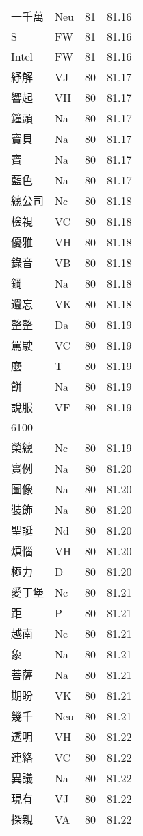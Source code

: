 \documentclass[twocolumn]{book}
\begin{document}
\begin{supertabular}{llrr}
一千萬 & Neu & 81 &  81.16\\
S & FW & 81 &  81.16\\
Intel & FW & 81 &  81.16\\
紓解 & VJ & 80 &  81.17\\
響起 & VH & 80 &  81.17\\
鐘頭 & Na & 80 &  81.17\\
寶貝 & Na & 80 &  81.17\\
寶 & Na & 80 &  81.17\\
藍色 & Na & 80 &  81.17\\
總公司 & Nc & 80 &  81.18\\
檢視 & VC & 80 &  81.18\\
優雅 & VH & 80 &  81.18\\
錄音 & VB & 80 &  81.18\\
鋼 & Na & 80 &  81.18\\
遺忘 & VK & 80 &  81.18\\
整整 & Da & 80 &  81.19\\
駕駛 & VC & 80 &  81.19\\
麼 & T & 80 &  81.19\\
餅 & Na & 80 &  81.19\\
說服 & VF & 80 &  81.19\\
6100\\
榮總 & Nc & 80 &  81.19\\
實例 & Na & 80 &  81.20\\
圖像 & Na & 80 &  81.20\\
裝飾 & Na & 80 &  81.20\\
聖誕 & Nd & 80 &  81.20\\
煩惱 & VH & 80 &  81.20\\
極力 & D & 80 &  81.20\\
愛丁堡 & Nc & 80 &  81.21\\
距 & P & 80 &  81.21\\
越南 & Nc & 80 &  81.21\\
象 & Na & 80 &  81.21\\
菩薩 & Na & 80 &  81.21\\
期盼 & VK & 80 &  81.21\\
幾千 & Neu & 80 &  81.21\\
透明 & VH & 80 &  81.22\\
連絡 & VC & 80 &  81.22\\
異議 & Na & 80 &  81.22\\
現有 & VJ & 80 &  81.22\\
探親 & VA & 80 &  81.22\\

\end{supertabular}
\end{document}
